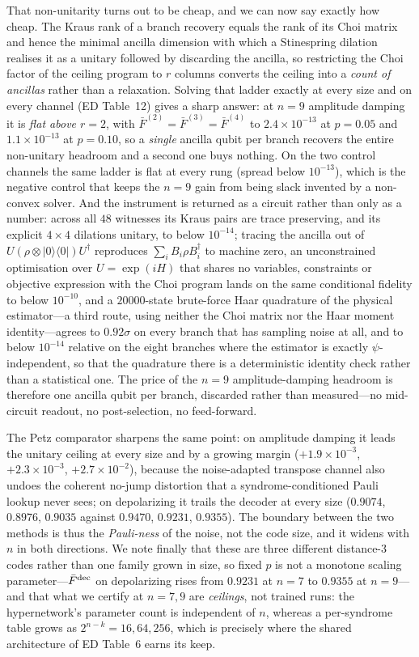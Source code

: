 \documentclass[aps,prxquantum,reprint,superscriptaddress]{revtex4-2}
\newcommand{\ket}[1]{\lvert #1\rangle}
\newcommand{\bra}[1]{\langle #1\rvert}
\begin{document}
That non-unitarity turns out to be cheap, and we can now say exactly how cheap.
The Kraus rank of a branch recovery equals the rank of its Choi matrix and hence
the minimal ancilla dimension with which a Stinespring dilation realises it as a
unitary followed by discarding the ancilla, so restricting the Choi factor of the
ceiling program to $r$ columns converts the ceiling into a \emph{count of
ancillas} rather than a relaxation. Solving that ladder exactly at every size and
on every channel (ED Table~12) gives a sharp answer: at $n=9$ amplitude damping it
is \emph{flat above $r=2$}, with $\bar F^{(2)}=\bar F^{(3)}=\bar F^{(4)}$ to
$2.4\times10^{-13}$ at $p=0.05$ and $1.1\times10^{-13}$ at $p=0.10$, so a
\emph{single} ancilla qubit per branch recovers the entire non-unitary headroom
and a second one buys nothing. On the two control channels the same ladder is flat
at every rung (spread below $10^{-13}$), which is the negative control that
keeps the $n=9$ gain from being slack invented by a non-convex solver. And the
instrument is returned as a circuit rather than only as a number: across all
$48$ witnesses its Kraus pairs are trace preserving, and its explicit
$4\times4$ dilations unitary, to below $10^{-14}$; tracing the ancilla out of
$U(\rho\otimes\ket0\bra0)U^\dagger$ reproduces $\sum_i B_i\rho B_i^\dagger$ to
machine zero, an unconstrained optimisation over $U=\exp(iH)$ that
shares no variables, constraints or objective expression with the Choi program
lands on the same conditional fidelity to below $10^{-10}$, and a
$20000$-state brute-force Haar quadrature of the physical estimator---a third
route, using neither the Choi matrix nor the Haar moment identity---agrees to
$0.92\sigma$ on every branch that has sampling noise at all, and to below
$10^{-14}$ relative on the eight branches where the estimator is exactly
$\psi$-independent, so that the quadrature there is a deterministic identity check
rather than a statistical one. The price of the $n=9$ amplitude-damping
headroom is therefore one ancilla qubit per branch, discarded rather than
measured---no mid-circuit readout, no post-selection, no feed-forward.

The Petz comparator sharpens the same point:
on amplitude damping it leads the unitary ceiling at every size and by a growing
margin ($+1.9\times10^{-3}$, $+2.3\times10^{-3}$, $+2.7\times10^{-2}$), because
the noise-adapted transpose channel also undoes the coherent no-jump distortion
that a syndrome-conditioned Pauli lookup never sees; on depolarizing it trails
the decoder at every size ($0.9074$, $0.8976$, $0.9035$ against $0.9470$,
$0.9231$, $0.9355$). The boundary between the two methods is thus the
\emph{Pauli-ness} of the noise, not the code size, and it widens with $n$ in both
directions. We note finally that these are three different distance-$3$ codes
rather than one family grown in size, so fixed $p$ is not a monotone
scaling parameter---$\bar F^{\rm dec}$ on depolarizing rises from $0.9231$ at
$n=7$ to $0.9355$ at $n=9$---and that what we certify at $n=7,9$ are
\emph{ceilings}, not trained runs: the hypernetwork's parameter count is
independent of $n$, whereas a per-syndrome table grows as $2^{n-k}=16,64,256$,
which is precisely where the shared architecture of ED Table~6 earns its keep.
\end{document}
